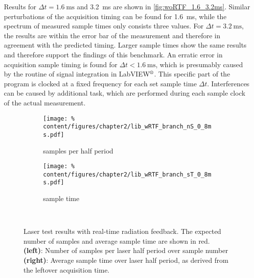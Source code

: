             Results for $\Delta t=\SI{1.6}{\milli\second}$ and \SI{3.2}{\milli\second} are shown in \cref{fig:woRTF_1.6_3.2ms}. Similar perturbations of the acquisition timing can be found for \SI{1.6}{\milli\second}, while the spectrum of measured sample times only consists three values. For $\Delta t=\SI{3.2}{\milli\second}$, the results are within the error bar of the measurement and therefore in agreement with the predicted timing. Larger sample times show the same results and therefore support the findings of this benchmark. An erratic error in acquisition sample timing is found for $\Delta t<\SI{1.6}{\milli\second}$, which is presumably caused by the routine of signal integration in LabVIEW$\textsuperscript{\textregistered}$. This specific part of the program is clocked at a fixed frequency for each set sample time $\Delta t$. Interferences can be caused by additional task, which are performed during each sample clock of the actual measurement.\\%
%
            \begin{figure}[t]%
                \centering%
                \begin{subfigure}{0.48\textwidth}%
                    \texttt{[image: \%
                        content/figures/chapter2/lib\_wRTF\_branch\_nS\_0\_8ms.pdf]}%
                    \caption{samples per half period}
                \end{subfigure}%
                \hspace*{0.25cm}%
                \begin{subfigure}{0.48\textwidth}%
                    \texttt{[image: \%
                        content/figures/chapter2/lib\_wRTF\_branch\_sT\_0\_8ms.pdf]}%
                    \caption{sample time}
                \end{subfigure}\\%
                \caption{Laser test results with real-time radiation feedback. The expected number of samples and average sample time are shown in red. \textbf{(left)}: Number of samples per laser half period over sample number \textbf{(right)}: Average sample time over laser half period, as derived from the leftover acquisition time.}\label{fig:wRTF_0.8ms}%
            \end{figure}%
%
